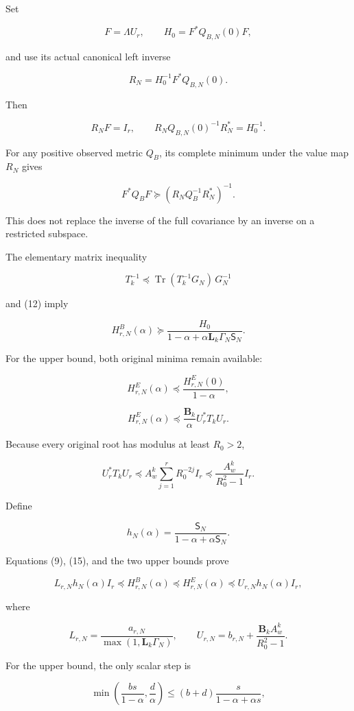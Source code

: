 \documentclass[11pt]{article}
\begin{document}
Set

\[
F=\Lambda U_r,\qquad
H_0=F^*Q_{B,N}(0)F,
\]

and use its actual canonical left inverse

\[
R_N=H_0^{-1}F^*Q_{B,N}(0).
\]

Then

\[
R_NF=I_r,
\qquad
R_NQ_{B,N}(0)^{-1}R_N^*=H_0^{-1}.
\tag{14}
\]

For any positive observed metric \(Q_B\), its complete minimum under the value map \(R_N\) gives

\[
F^*Q_BF
\succeq
(R_NQ_B^{-1}R_N^*)^{-1}.
\]

This does not replace the inverse of the full covariance by an inverse on a restricted subspace.

The elementary matrix inequality

\[
T_k^{-1}\preceq
\operatorname{Tr}(T_k^{-1}G_N)\,G_N^{-1}
\]

and (12) imply

\[
\boxed{
H^B_{r,N}(\alpha)
\succeq
\frac{H_0}
{1-\alpha+\alpha\mathbf L_k\Gamma_N\mathsf S_N}.
}
\tag{15}
\]

For the upper bound, both original minima remain available:

\[
H^E_{r,N}(\alpha)
\preceq\frac{H^E_{r,N}(0)}{1-\alpha},
\]

\[
H^E_{r,N}(\alpha)
\preceq\frac{\mathbf B_k}{\alpha}U_r^*T_kU_r.
\]

Because every original root has modulus at least \(R_0>2\),

\[
U_r^*T_kU_r
\preceq
A_w^k\sum_{j=1}^rR_0^{-2j}I_r
\preceq
\frac{A_w^k}{R_0^2-1}I_r.
\]

Define

\[
\boxed{
h_N(\alpha)=
\frac{\mathsf S_N}{1-\alpha+\alpha\mathsf S_N}.
}
\tag{16}
\]

Equations (9), (15), and the two upper bounds prove

\[
\boxed{
L_{r,N}h_N(\alpha)I_r
\preceq H^B_{r,N}(\alpha)
\preceq H^E_{r,N}(\alpha)
\preceq U_{r,N}h_N(\alpha)I_r,
}
\tag{17}
\]

where

\[
L_{r,N}
=
\frac{a_{r,N}}{\max(1,\mathbf L_k\Gamma_N)},
\qquad
U_{r,N}
=
b_{r,N}+\frac{\mathbf B_kA_w^k}{R_0^2-1}.
\]

For the upper bound, the only scalar step is

\[
\min\left(\frac{bs}{1-\alpha},\frac d\alpha\right)
\le
(b+d)\frac{s}{1-\alpha+\alpha s},
\]
\end{document}
